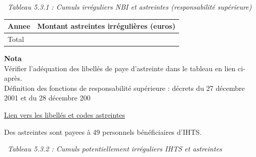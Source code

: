 ~\emph{Tableau 5.3.1 : Cumuls irréguliers NBI et astreintes
(responsabilité supérieure)}

\begin{longtable}[]{@{}ll@{}}
\toprule
Annee & Montant astreintes irrégulières (euros)\tabularnewline
\midrule
\endhead
Total &\tabularnewline
\bottomrule
\end{longtable}

\textbf{Nota}\\
Vérifier l'adéquation des libellés de paye d'astreinte dans le tableau
en lien ci-après.\\
Définition des fonctions de responsabilité supérieure : décrets du 27
décembre 2001 et du 28 décembre 200

\href{../Bases/Reglementation/libelles.astreintes.csv}{Lien vers les
libellés et codes astreintes}

Des astreintes sont payees à 49 personnels bénéficiaires d'IHTS.

~\emph{Tableau 5.3.2 : Cumuls potentiellement irréguliers IHTS et
astreintes}

